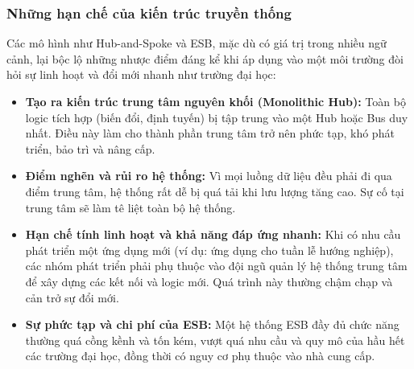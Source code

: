 \subsubsection{Những hạn chế của kiến trúc truyền thống}
Các mô hình như Hub-and-Spoke và ESB, mặc dù có giá trị trong nhiều ngữ cảnh, lại bộc lộ những nhược điểm đáng kể khi áp dụng vào một môi trường đòi hỏi sự linh hoạt và đổi mới nhanh như trường đại học:
\begin{itemize}
    \item \textbf{Tạo ra kiến trúc trung tâm nguyên khối (Monolithic Hub):} Toàn bộ logic tích hợp (biến đổi, định tuyến) bị tập trung vào một Hub hoặc Bus duy nhất. Điều này làm cho thành phần trung tâm trở nên phức tạp, khó phát triển, bảo trì và nâng cấp.
    \item \textbf{Điểm nghẽn và rủi ro hệ thống:} Vì mọi luồng dữ liệu đều phải đi qua điểm trung tâm, hệ thống rất dễ bị quá tải khi lưu lượng tăng cao. Sự cố tại trung tâm sẽ làm tê liệt toàn bộ hệ thống.
    \item \textbf{Hạn chế tính linh hoạt và khả năng đáp ứng nhanh:} Khi có nhu cầu phát triển một ứng dụng mới (ví dụ: ứng dụng cho tuần lễ hướng nghiệp), các nhóm phát triển phải phụ thuộc vào đội ngũ quản lý hệ thống trung tâm để xây dựng các kết nối và logic mới. Quá trình này thường chậm chạp và cản trở sự đổi mới.
    \item \textbf{Sự phức tạp và chi phí của ESB:} Một hệ thống ESB đầy đủ chức năng thường quá cồng kềnh và tốn kém, vượt quá nhu cầu và quy mô của hầu hết các trường đại học, đồng thời có nguy cơ phụ thuộc vào nhà cung cấp.
\end{itemize}

